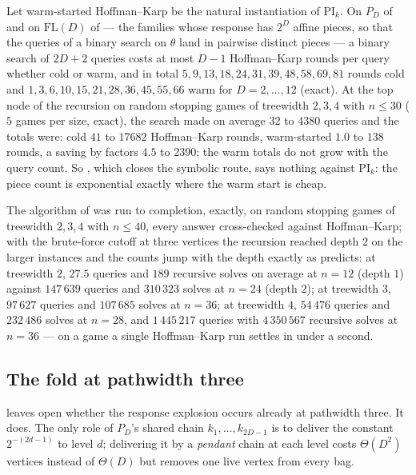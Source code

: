 \begin{proposition}\label{wa:warm-measured}
Let warm-started Hoffman--Karp be the natural instantiation of $\mathrm{PI}_k$.
On $P_D$ of  and on $\mathrm{FL}(D)$ of  --- the
families whose response has $2^{D}$ affine pieces, so that the queries of a
binary search on $\theta$ land in pairwise distinct pieces --- a binary search
of $2D+2$ queries costs at most $D-1$ Hoffman--Karp rounds per query whether
cold or warm, and in total $5,9,13,18,24,31,39,48,58,69,81$ rounds cold and
$1,3,6,10,15,21,28,36,45,55,66$ warm for $D=2,\dots,12$ (exact). At the top node
of the  recursion on random stopping games of treewidth $2,3,4$
with $n\le30$ ($5$ games per size, exact), the search made on average $32$ to
$4380$ queries and the totals were: cold $41$ to $17682$ Hoffman--Karp rounds,
warm-started $1.0$ to $138$ rounds, a saving by factors $4.5$ to $2390$; the
warm totals do not grow with the query count. So , which
closes the symbolic route, says nothing against $\mathrm{PI}_k$: the piece count
is exponential exactly where the warm start is cheap.
\end{proposition}

\begin{remark}\label{wa:qp-measured}
The algorithm of  was run to completion, exactly, on random
stopping games of treewidth $2,3,4$ with $n\le40$, every answer cross-checked
against Hoffman--Karp; with the brute-force cutoff at three vertices the
recursion reached depth $2$ on the larger instances and the counts jump with the
depth exactly as  predicts: at treewidth $2$, $27.5$ queries
and $189$ recursive solves on average at $n=12$ (depth $1$) against $147\,639$
queries and $310\,323$ solves at $n=24$ (depth $2$); at treewidth $3$, $97\,627$
queries and $107\,685$ solves at $n=36$; at treewidth $4$, $54\,476$ queries and
$232\,486$ solves at $n=28$, and $1\,445\,217$ queries with $4\,350\,567$
recursive solves at $n=36$ --- on a game a single Hoffman--Karp run settles in
under a second.
\end{remark}

\subsection{The fold at pathwidth three}\label{wa:sec-fold3}

 leaves open whether the response explosion occurs already
at pathwidth three. It does. The only role of $P_D$'s shared chain
$k_1,\dots,k_{2D-1}$ is to deliver the constant $2^{-(2d-1)}$ to level $d$;
delivering it by a \emph{pendant} chain at each level costs $\Theta(D^{2})$
vertices instead of $\Theta(D)$ but removes one live vertex from every bag.

